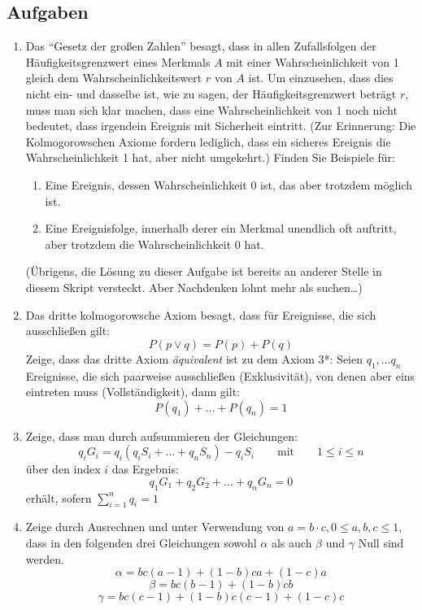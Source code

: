 \subsection{Aufgaben}

\begin{enumerate}
  \item Das "`Gesetz der großen Zahlen"' besagt, dass in allen Zufallsfolgen
  der Häufigkeitsgrenzwert eines Merkmals $A$ mit einer Wahrscheinlichkeit von
  1 gleich dem Wahrscheinlichkeitswert $r$ von $A$ ist. Um einzusehen, dass dies
  nicht ein- und dasselbe ist, wie zu sagen, der Häufigkeitsgrenzwert beträgt
  $r$, muss man sich klar machen, dass eine Wahrscheinlichkeit von 1 noch nicht
  bedeutet, dass irgendein Ereignis mit Sicherheit eintritt. (Zur Erinnerung:
  Die Kolmogorowschen Axiome fordern lediglich, dass ein sicheres Ereignis die
  Wahrscheinlichkeit 1 hat, aber nicht umgekehrt.) Finden Sie Beispiele für:
  \begin{enumerate}
    \item Eine Ereignis, dessen Wahrscheinlichkeit 0 ist, das aber trotzdem
    möglich ist.
    \item Eine Ereignisfolge, innerhalb derer ein Merkmal unendlich oft
    auftritt, aber trotzdem die Wahrscheinlichkeit 0 hat.
  \end{enumerate}
  (Übrigens, die Lösung zu dieser Aufgabe ist bereits an anderer Stelle in
  diesem Skript versteckt. Aber Nachdenken lohnt mehr als suchen\ldots)
  
  \item Das dritte kolmogorowsche Axiom besagt, dass für Ereignisse, die sich
  ausschließen gilt: \[P(p \vee q) = P(p) + P(q)\]
  Zeige, dass das dritte Axiom {\em äquivalent} ist zu dem Axiom 3*: 
  Seien $q_1,\ldots q_n$ Ereignisse, die sich paarweise 
  ausschließen (Exklusivität), von denen aber eins eintreten muss
  (Vollständigkeit), dann gilt:
  \[ P(q_1) + \ldots + P(q_n) = 1 \]
  
  \item Zeige, dass man durch aufsummieren der Gleichungen:
  \[q_iG_i = q_i(q_iS_i + \ldots + q_nS_n) - q_iS_i 
    \qquad \mbox{mit} \qquad 1 \leq i \leq n \] 
  über den index $i$ das Ergebnis: \[ q_1G_1 + q_2G_2 + \ldots + q_nG_n = 0 \]
  erhält, sofern $\sum_{i=1}^n q_i = 1$
  
  \item Zeige durch Ausrechnen und unter Verwendung von $a=b\cdot c, 0
  \leq a,b,c \leq 1$, dass in den folgenden drei Gleichungen sowohl $\alpha$ als
  auch $\beta$ und $\gamma$ Null sind werden. 
    \[ \alpha = bc(a-1) + (1-b)ca + (1-c)a \]
    \[ \beta  = bc(b-1) + (1-b)cb  \]
    \[ \gamma = bc(c-1) + (1-b)c(c-1) + (1-c)c \]
  

\end{enumerate}
